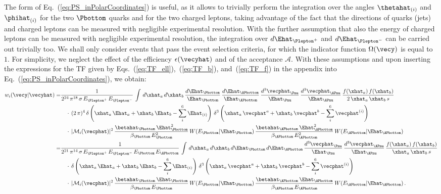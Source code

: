 The form of Eq.~(\ref{eq:PS_inPolarCoordinates}) is useful, 
as it allows to trivially perform the integration over the 
angles $\thetahat_{(i)}$ and $\phihat_{(i)}$ for the two $\Pbottom$ quarks and for the two charged leptons,
taking advantage of the fact that the directions of quarks (jets) and charged leptons can be measured with negligible experimental resolution.
With the further assumption that also the energy of charged leptons can be measured with negligible experimental resolution,
the integration over $d\Ehat_{\Plepton^{+}}$ and $d\Ehat_{\Plepton^{-}}$ can be carried out trivially too.
We shall only consider events that pass the event selection criteria, \ie for which the indicator function $\Omega(\vecy)$ is equal to $1$.
For simplicity, we neglect the effect of the efficiency $\epsilon(\vecyhat)$ and of the acceptance $\mathcal{A}$.
With these assumptions and upon inserting the expressions for the TF given by Eqs.~(\ref{eq:TF_ell}),~(\ref{eq:TF_b}), and~(\ref{eq:TF_f}) in the appendix
into Eq.~(\ref{eq:PS_inPolarCoordinates}), we obtain:
\begin{align}
w_{i}(\vecy|\vecyhat) 
 = & \frac{1}{2^{24} \, \pi^{18} \, \sigma \, E_{\Plepton^{+}} \, E_{\Plepton^{-}}} \, \int \, d\xhat_{a} \, d\xhat_{b} \,
\frac{d\Ehat_{\Pbottom}}{\Ehat_{\Pbottom}} \, \frac{d\Ehat_{\APbottom}}{\Ehat_{\APbottom}} \, \frac{d^{3}\vecphat_{\Pnu}}{\Ehat_{\Pnu}} \, \frac{d^{3}\vecphat_{\APnu}}{\Ehat_{\APnu}} \,
\frac{f(\xhat_{a}) \, f(\xhat_{b})}{2 \, \xhat_{a} \, \xhat_{b} \, s} \nonumber \\
 & \quad \cdot \, (2 \, \pi)^{4} \, \delta\left( \xhat_{a} \, \Ehat_{a} + \xhat_{b} \, \Ehat_{b} - \sum_{i}^{6} \Ehat_{(i)}\right) \, 
\delta^{3}\left( \xhat_{a} \, \vecphat^{a} + \xhat_{b} \, \vecphat^{b} - \sum_{i}^{6} \vecphat^{(i)}\right) \nonumber \\
 & \quad \cdot \, \vert \mathcal{M}_{i}(\vecphat) \vert^{2} \, \frac{\betahat_{\Pbottom} \, \Ehat_{\Pbottom}^{2}}{\beta_{\Pbottom} \, E_{\Pbottom}^{2}} \, W(E_{\Pbottom}|\Ehat_{\Pbottom}) \, 
\frac{\betahat_{\APbottom} \, \Ehat_{\APbottom}^{2}}{\beta_{\APbottom} \, E_{\APbottom}^{2}} \, W(E_{\APbottom}|\Ehat_{\APbottom}) \nonumber \\
 = & \frac{1}{2^{21} \, \pi^{14} \, \sigma \, E_{\Plepton^{+}} \, E_{\Plepton^{-}} \, E_{\Pbottom} \, E_{\APbottom}} \, \int \, d\xhat_{a} \, d\xhat_{b} \,
d\Ehat_{\Pbottom} \, d\Ehat_{\APbottom} \, \frac{d^{3}\vecphat_{\Pnu}}{\Ehat_{\Pnu}} \, \frac{d^{3}\vecphat_{\APnu}}{\Ehat_{\APnu}} \,
\frac{f(\xhat_{a}) \, f(\xhat_{b})}{\xhat_{a} \, \xhat_{b} \, s} \nonumber \\
 & \quad \cdot \, \delta\left( \xhat_{a} \, \Ehat_{a} + \xhat_{b} \, \Ehat_{b} - \sum_{i}^{6} \Ehat_{(i)}\right) \,
\delta^{3}\left( \xhat_{a} \, \vecphat^{a} + \xhat_{b} \, \vecphat^{b} - \sum_{i}^{6} \vecphat^{(i)}\right) \nonumber \\
 & \quad \cdot \, \vert \mathcal{M}_{i}(\vecphat) \vert^{2}\, \frac{\betahat_{\Pbottom} \, \Ehat_{\Pbottom}}{\beta_{\Pbottom} \, E_{\Pbottom}} \, W(E_{\Pbottom}|\Ehat_{\Pbottom}) \, 
\frac{\betahat_{\APbottom} \, \Ehat_{\APbottom}}{\beta_{\APbottom} \, E_{\APbottom}} \, W(E_{\APbottom}|\Ehat_{\APbottom}) \, .
\label{eq:mem2}
\end{align}
